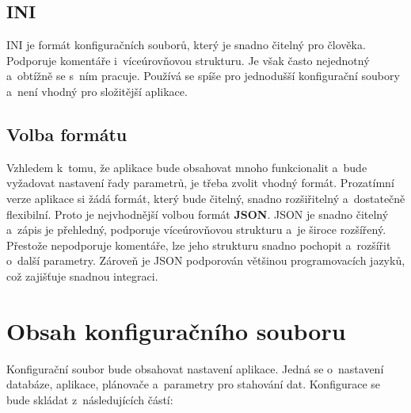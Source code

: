 \subsection{INI}
INI je formát konfiguračních souborů, který je snadno čitelný pro člověka.
Podporuje komentáře i~víceúrovňovou strukturu.
Je však často nejednotný a~obtížně se s~ním pracuje.
Používá se spíše pro jednodušší konfigurační soubory a~není vhodný pro složitější aplikace.

\subsection{Volba formátu}
Vzhledem k~tomu, že aplikace bude obsahovat mnoho funkcionalit a~bude vyžadovat nastavení řady parametrů, je třeba zvolit vhodný formát.
Prozatímní verze aplikace si žádá formát, který bude čitelný, snadno rozšiřitelný a~dostatečně flexibilní.
Proto je nejvhodnější volbou formát \textbf{JSON}.
JSON je snadno čitelný a~zápis je přehledný, podporuje víceúrovňovou strukturu a~je široce rozšířený.
Přestože nepodporuje komentáře, lze jeho strukturu snadno pochopit a~rozšířit o~další parametry.
Zároveň je JSON podporován většinou programovacích jazyků, což zajišťuje snadnou integraci.

\section{Obsah konfiguračního souboru}
\label{sec:konfiguracni_soubor}
Konfigurační soubor bude obsahovat nastavení aplikace.
Jedná se o~nastavení databáze, aplikace, plánovače a~parametry pro stahování dat.
Konfigurace se bude skládat z~následujících částí:

